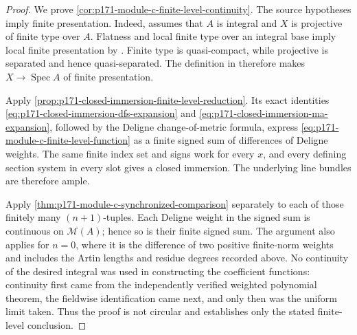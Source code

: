 \begin{proof}
We prove \cref{cor:p171-module-c-finite-level-continuity}.  The source
hypotheses imply finite presentation.  Indeed,
\cite[Section~2]{PS23Hybrid} assumes that \(A\) is integral and \(X\) is
projective of finite type over \(A\).  Flatness and local finite type over an
integral base imply local finite presentation by
\cite[Tag~\texttt{05IN}]{stacks-project}.  Finite type is
quasi-compact, while projective is separated and hence quasi-separated.
The definition in \cite[Tag~\texttt{01TP}]{stacks-project} therefore makes
\(X\to\operatorname{Spec}A\) of finite presentation.

Apply \cref{prop:p171-closed-immersion-finite-level-reduction}.  Its exact
identities \eqref{eq:p171-closed-immersion-dfs-expansion} and
\eqref{eq:p171-closed-immersion-ma-expansion}, followed by the Deligne
change-of-metric formula, express
\eqref{eq:p171-module-c-finite-level-function} as a finite signed sum of
differences of Deligne weights.  The same finite index set and signs work
for every \(x\), and every defining section system in every slot gives a
closed immersion.  The underlying line bundles are therefore ample.

Apply \cref{thm:p171-module-c-synchronized-comparison} separately to each
of those finitely many \((n+1)\)-tuples.  Each Deligne weight in the signed
sum is continuous on \(\mathcal M(A)\); hence so is their finite signed
sum.  The argument also applies for \(n=0\), where it is the difference of
two positive finite-norm weights and includes the Artin lengths and residue
degrees recorded above.  No continuity of the desired integral was used in
constructing the coefficient functions: continuity first came from the
independently verified weighted polynomial theorem, the fieldwise
identification came next, and only then was the uniform limit taken.  Thus
the proof is not circular and establishes only the stated finite-level
conclusion.
\end{proof}
